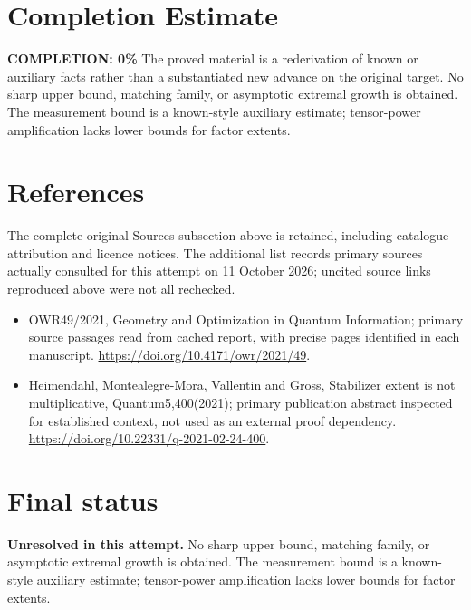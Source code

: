 \documentclass[11pt]{article}
\begin{document}
\section{Completion Estimate}
\noindent\textbf{COMPLETION: 0\%}
The proved material is a rederivation of known or auxiliary facts rather than a substantiated new advance on the original target. No sharp upper bound, matching family, or asymptotic extremal growth is obtained. The measurement bound is a known-style auxiliary estimate; tensor-power amplification lacks lower bounds for factor extents.
\section{References}
The complete original Sources subsection above is retained, including catalogue attribution and licence notices. The additional list records primary sources actually consulted for this attempt on 11 October 2026; uncited source links reproduced above were not all rechecked.
\begin{itemize}
\item OWR49/2021, Geometry and Optimization in Quantum Information; primary source passages read from cached report, with precise pages identified in each manuscript. \url{https://doi.org/10.4171/owr/2021/49}.
\item Heimendahl, Montealegre-Mora, Vallentin and Gross, Stabilizer extent is not multiplicative, Quantum5,400(2021); primary publication abstract inspected for established context, not used as an external proof dependency. \url{https://doi.org/10.22331/q-2021-02-24-400}.
\end{itemize}
\section{Final status}
\textbf{Unresolved in this attempt.} No sharp upper bound, matching family, or asymptotic extremal growth is obtained. The measurement bound is a known-style auxiliary estimate; tensor-power amplification lacks lower bounds for factor extents.
\end{document}
